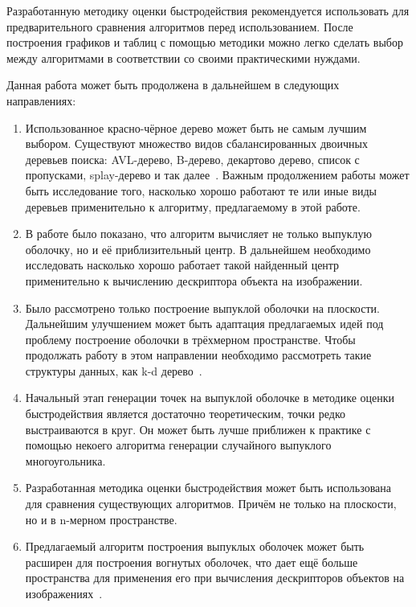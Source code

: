 Разработанную методику оценки быстродействия рекомендуется использовать для предварительного сравнения алгоритмов перед использованием. После построения графиков и таблиц с помощью методики можно легко сделать выбор между алгоритмами в соответствии со своими практическими нуждами.

Данная работа может быть продолжена в дальнейшем в следующих направлениях:
\begin{enumerate}
	\item Использованное красно-чёрное дерево может быть не самым лучшим выбором. Существуют множество видов сбалансированных двоичных деревьев поиска: AVL-дерево, B-дерево, декартово дерево, список с пропусками, splay-дерево и так далее~\cite{neerc2010algorithms}. Важным продолжением работы может быть исследование того, насколько хорошо работают те или иные виды деревьев применительно к алгоритму, предлагаемому в этой работе.
	\item В работе было показано, что алгоритм вычисляет не только выпуклую оболочку, но и её приблизительный центр. В дальнейшем необходимо исследовать насколько хорошо работает такой найденный центр применительно к вычислению дескриптора объекта на изображении.
	\item Было рассмотрено только построение выпуклой оболочки на плоскости. Дальнейшим улучшением может быть адаптация предлагаемых идей под проблему построение оболочки в трёхмерном пространстве. Чтобы продолжать работу в этом направлении необходимо рассмотреть такие структуры данных, как k-d дерево~\cite{bentley1975multidimensional}.
	\item Начальный этап генерации точек на выпуклой оболочке в методике оценки быстродействия является достаточно теоретическим, точки редко выстраиваются в круг. Он может быть лучше приближен к практике с помощью некоего алгоритма генерации случайного выпуклого многоугольника.
	\item Разработанная методика оценки быстродействия может быть использована для сравнения существующих алгоритмов. Причём не только на плоскости, но и в n-мерном пространстве.
	\item Предлагаемый алгоритм построения выпуклых оболочек может быть расширен для построения вогнутых оболочек, что дает ещё больше пространства для применения его при вычисления дескрипторов объектов на изображениях~\cite{braune2016obtaining}.
\end{enumerate}

